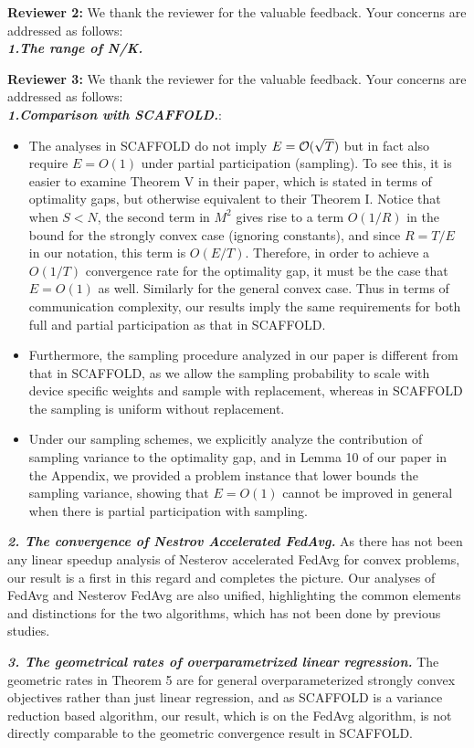\documentclass{article}
\begin{document}
% 
{\color{blue}\textbf{Reviewer 2:}} We thank the reviewer for the valuable feedback. Your concerns are addressed as follows: \\
\textbf{\textit{1.The range of N/K.}}

% 

{\color{blue}\textbf{Reviewer 3:}} We thank the reviewer for the valuable feedback. Your concerns are addressed as follows: \\
\textbf{\textit{1.Comparison with SCAFFOLD.}}: 
\begin{itemize}
	\item The analyses in SCAFFOLD do not imply $E={\mathcal{O}}(\sqrt{T})$ but in fact also require $E=O(1)$ under partial participation (sampling). To see this, it is easier to examine Theorem V in their paper, which is stated in terms of optimality gaps, but otherwise equivalent to their Theorem I. Notice that when $S<N$, the second term in $M^2$ gives rise to a term $O(1/R)$ in the bound for the strongly convex case (ignoring constants), and since $R=T/E$ in our notation, this term is $O(E/T)$. Therefore, in order to achieve a $O(1/T)$ convergence rate for the optimality gap, it must be the case that $E=O(1)$ as well. Similarly for the general convex case. Thus in terms of communication complexity, our results imply the same requirements for both full and partial participation as that in SCAFFOLD. 
	\item Furthermore, the sampling procedure analyzed in our paper is different from that in SCAFFOLD, as we allow the sampling probability to scale with device specific weights and sample with replacement, whereas in SCAFFOLD the sampling is uniform without replacement. 
	\item  Under our sampling schemes, we explicitly analyze the contribution of sampling variance to the optimality gap, and in Lemma 10 of our paper in the Appendix, we provided a problem instance that lower bounds the sampling variance, showing that $E=O(1)$ cannot be improved in general when there is partial participation with sampling.
\end{itemize}

\textbf{\textit{2. The convergence of Nestrov Accelerated FedAvg.}}
As there has not been any linear speedup analysis of Nesterov accelerated FedAvg for convex problems, our result is a first in this regard and completes the picture. Our analyses of FedAvg and Nesterov FedAvg are also unified, highlighting the common elements and distinctions for the two algorithms, which has not been done by previous studies. 

\textbf{\textit{3. The geometrical rates of overparametrized linear regression.}}
The geometric rates in Theorem 5 are for general overparameterized strongly convex objectives rather than just linear regression, and as SCAFFOLD is a variance reduction based algorithm, our result, which is on the FedAvg algorithm, is not directly comparable to the geometric convergence result in SCAFFOLD.


    
\end{document}
